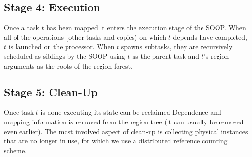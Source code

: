 \subsection{Stage 4: Execution}
\label{sec:exec}

Once a task $t$ has been mapped it enters the execution stage of the SOOP.  When all of
the operations (other tasks and copies) on which $t$ depends have completed, $t$ is
launched on the processor.  When $t$ spawns subtasks, they are recursively scheduled as siblings by
the SOOP using $t$ as the parent task and $t$'s region arguments as the roots of the region forest.


\subsection{Stage 5: Clean-Up}
\label{sec:clean}

Once task $t$ is done executing its state can be reclaimed Dependence
and mapping information is removed from the region tree (it can
usually be removed even earlier).  The most involved aspect of
clean-up is collecting physical instances that are no longer in use,
for which we use a distributed reference counting scheme.


